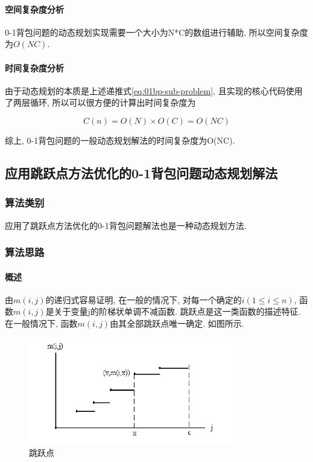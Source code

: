 \paragraph{空间复杂度分析}
0-1背包问题的动态规划实现需要一个大小为N*C的数组进行辅助,
所以空间复杂度为$O(NC)$.

\paragraph{时间复杂度分析}
由于动态规划的本质是上述递推式\ref{eq:01bp-sub-problem},
且实现的核心代码使用了两层循环, 所以可以很方便的计算出时间复杂度为

\begin{equation}
	C(n) = O(N)\times O(C) = O(NC)
\end{equation}

综上, 0-1背包问题的一般动态规划解法的时间复杂度为O(NC).

\subsection{应用跳跃点方法优化的0-1背包问题动态规划解法}
\subsubsection{算法类别}
应用了跳跃点方法优化的0-1背包问题解法也是一种动态规划方法.

\subsubsection{算法思路}
\label{sec:jumpPointThink}
\paragraph{概述}
由$m(i, j)$的递归式容易证明, 在一般的情况下, 对每一个确定的$i(1\leq i\leq n)$,
函数$m(i, j)$是关于变量j的阶梯状单调不减函数. 跳跃点是这一类函数的描述特征.
在一般情况下, 函数$m(i, j)$由其全部跳跃点唯一确定. 如图所示.

\begin{figure}[ht!]
	\centering
	\includegraphics[width=0.8\textwidth]{figures/JumpPoint.png}
	\caption{跳跃点}
	\label{fig:JumpPoint}
\end{figure}

